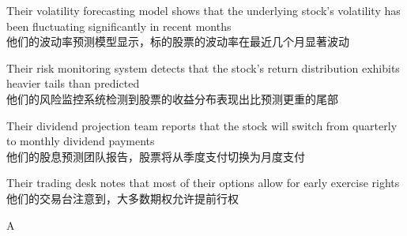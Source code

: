 \documentclass{article}
\begin{document}
                \begin{choices}
                \item Their volatility forecasting model shows that the underlying stock's volatility has been fluctuating significantly in recent months\\
                他们的波动率预测模型显示，标的股票的波动率在最近几个月显著波动
                \item Their risk monitoring system detects that the stock's return distribution exhibits heavier tails than predicted\\
                他们的风险监控系统检测到股票的收益分布表现出比预测更重的尾部
                \item Their dividend projection team reports that the stock will switch from quarterly to monthly dividend payments\\
                他们的股息预测团队报告，股票将从季度支付切换为月度支付
                \item Their trading desk notes that most of their options allow for early exercise rights\\
                他们的交易台注意到，大多数期权允许提前行权
                \end{choices}
                
                \begin{correctanswer}
                A
                \end{correctanswer}
                
\end{document}
